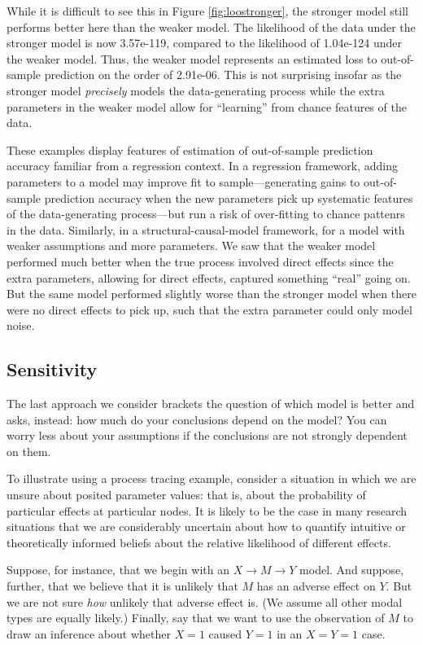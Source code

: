 \documentclass[
  12pt,
]{book}
\begin{document}
While it is difficult to see this in Figure \ref{fig:loostronger}, the stronger model still performs better here than the weaker model. The likelihood of the data under the stronger model is now 3.57e-119, compared to
the likelihood of 1.04e-124 under the weaker model. Thus, the weaker model represents an estimated loss to out-of-sample prediction on the order of 2.91e-06. This is not surprising insofar as the stronger model \emph{precisely} models the data-generating process while the extra parameters in the weaker model allow for ``learning'' from chance features of the data.

These examples display features of estimation of out-of-sample prediction accuracy familiar from a regression context. In a regression framework, adding parameters to a model may improve fit to sample---generating gains to out-of-sample prediction accuracy when the new parameters pick up systematic features of the data-generating process---but run a risk of over-fitting to chance pattenrs in the data. Similarly, in a structural-causal-model framework, for a model with weaker assumptions and more parameters. We saw that the weaker model performed much better when the true process involved direct effects since the extra parameters, allowing for direct effects, captured something ``real'' going on. But the same model performed slightly worse than the stronger model when there were no direct effects to pick up, such that the extra parameter could only model noise.

\hypertarget{sensitivity}{%
\subsection{Sensitivity}\label{sensitivity}}

The last approach we consider brackets the question of which model is better and asks, instead: how much do your conclusions depend on the model? You can worry less about your assumptions if the conclusions are not strongly dependent on them.

To illustrate using a process tracing example, consider a situation in which we are unsure about posited parameter values: that is, about the probability of particular effects at particular nodes. It is likely to be the case in many research situations that we are considerably uncertain about how to quantify intuitive or theoretically informed beliefs about the relative likelihood of different effects.

Suppose, for instance, that we begin with an \(X \rightarrow M \rightarrow Y\) model. And suppose, further, that we believe that it is unlikely that \(M\) has an adverse effect on \(Y\). But we are not sure \emph{how} unlikely that adverse effect is. (We assume all other modal types are equally likely.) Finally, say that we want to use the observation of \(M\) to draw an inference about whether \(X=1\) caused \(Y=1\) in an \(X=Y=1\) case.
\end{document}
